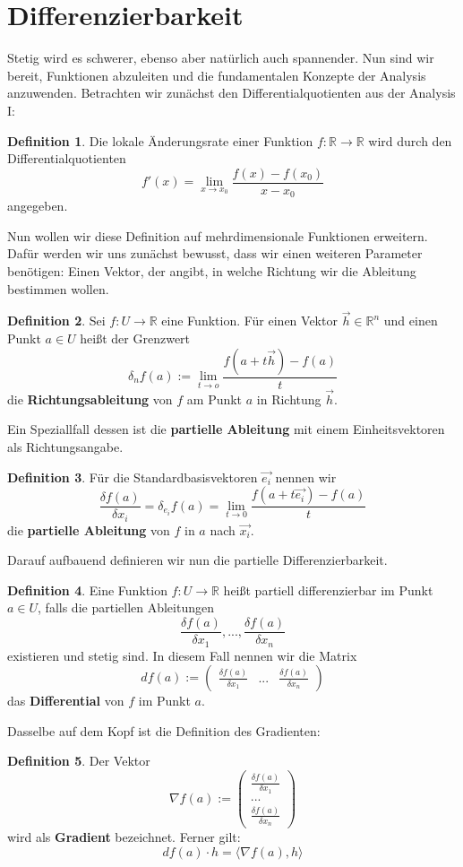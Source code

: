 \documentclass[11pt,a4paper]{scrartcl}
\theoremstyle{remark}
\theoremstyle{definition}
\newtheorem{definition}{Definition}[section]
\begin{document}
\section{Differenzierbarkeit}
Stetig wird es schwerer, ebenso aber natürlich auch spannender. Nun sind wir bereit, Funktionen abzuleiten und die fundamentalen Konzepte der Analysis anzuwenden. Betrachten wir zunächst den Differentialquotienten aus der Analysis I:
\begin{definition}
Die lokale Änderungsrate einer Funktion $f: \mathbb{R} \to \mathbb{R}$ wird durch den Differentialquotienten
\[f'(x) = \lim _{x \to x_0} \frac{f(x) - f(x_0)}{x - x_0}\] angegeben.
\end{definition}
Nun wollen wir diese Definition auf mehrdimensionale Funktionen erweitern. Dafür werden wir uns zunächst bewusst, dass wir einen weiteren Parameter benötigen: Einen Vektor, der angibt, in welche Richtung wir die Ableitung bestimmen wollen.
\begin{definition}
Sei $f: U \to \mathbb{R}$ eine Funktion. Für einen Vektor $\vec{h} \in \mathbb{R}^{n}$ und einen Punkt $a \in U$ heißt der Grenzwert
\[\delta _{n} f(a) := \lim _{t \to o} \frac{f(a + t\vec{h}) - f(a)}{t}\] die \textbf{Richtungsableitung} von $f$ am Punkt $a$ in Richtung $\vec{h}$.
\end{definition}
Ein Speziallfall dessen ist die \textbf{partielle Ableitung} mit einem Einheitsvektoren als Richtungsangabe.
\begin{definition}
Für die Standardbasisvektoren $\vec{e_i}$ nennen wir 
\[\frac{\delta f(a)}{\delta x_i} = \delta _{e_i} f(a) = \lim _{t \to 0} \frac{f(a + t\vec{e_i}) - f(a)}{t}\]
die \textbf{partielle Ableitung} von $f$ in $a$ nach $\vec{x_i}$.
\end{definition}
Darauf aufbauend definieren wir nun die partielle Differenzierbarkeit.
\begin{definition}
Eine Funktion $f: U \to \mathbb{R}$ heißt partiell differenzierbar im  Punkt $a \in U$, falls die partiellen Ableitungen
\[\frac{\delta f(a)}{\delta x_1}, ..., \frac{\delta f(a)}{\delta x_n}\]
existieren und stetig sind. In diesem Fall nennen wir die Matrix \[
df(a) := \left( \begin{matrix}\frac{\delta f(a)}{\delta x_1} & ... & \frac{\delta f(a)}{\delta x_n}\end{matrix}\right)
\]
das \textbf{Differential} von $f$ im Punkt $a$.
\end{definition}
Dasselbe auf dem Kopf ist die Definition des Gradienten:
\begin{definition}
Der Vektor \[\nabla f(a) := \left( \begin{matrix}\frac{\delta f(a)}{\delta x_1} \\ ... \\ \frac{\delta f(a)}{\delta x_n}\end{matrix}\right)\]
wird als \textbf{Gradient} bezeichnet. Ferner gilt:\[
df(a) \cdot h = \langle \nabla f(a), h \rangle\]
\end{definition}
\end{document}
